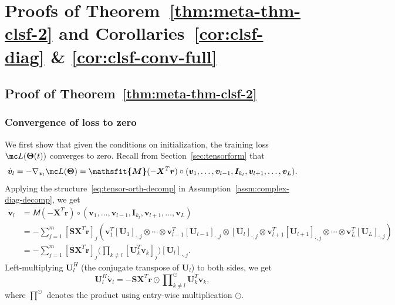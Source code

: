\documentclass{article} %
\def\vr{{\bm{r}}}
\def\vv{{\bm{v}}}
\def\mI{{\bm{I}}}
\def\mS{{\bm{S}}}
\def\mU{{\bm{U}}}
\def\mX{{\bm{X}}}
\newcommand{\tens}[1]{\bm{\mathsfit{#1}}}
\def\tM{{\tens{M}}}
\newcommand{\bTheta}{\bm{\Theta}}
\begin{document}
\section{Proofs of Theorem~\ref{thm:meta-thm-clsf-2} and Corollaries~\ref{cor:clsf-diag} \& \ref{cor:clsf-conv-full}}
\label{sec:proof-meta-thm-clsf-2}
\subsection{Proof of Theorem~\ref{thm:meta-thm-clsf-2}}
\subsubsection{Convergence of loss to zero}
\label{sec:proof-meta-thm-clsf-2-conv}
We first show that given the conditions on initialization, the training loss $\mc L(\bTheta(t))$ converges to zero.
Recall from Section~\ref{sec:tensorform} that
\begin{align*}
    \dot \vv_l 
    = -\nabla_{\vv_l} \mc L(\bTheta)
    = \tM(-\mX^T \vr) \circ (\vv_1, \dots, \vv_{l-1}, \mI_{k_l}, \vv_{l+1}, \dots, \vv_L).
\end{align*}
Applying the structure~\eqref{eq:tensor-orth-decomp} in Assumption~\ref{assm:complex-diag-decomp}, we get
\begin{align*}
    \dot \vv_l 
    &= \tM(-\mX^T \vr) \circ (\vv_1, \dots, \vv_{l-1}, \mI_{k_l}, \vv_{l+1}, \dots, \vv_L)\\
    &= -\!\sum_{j=1}^m [\mS\mX^T\vr]_j (\vv_1^T[\mU_1]_{\cdot,j} \!\otimes \cdots \otimes \vv_{l-1}^T[\mU_{l-1}]_{\cdot,j} \!\otimes [\mU_l]_{\cdot, j} \!\otimes \vv_{l+1}^T[\mU_{l+1}]_{\cdot, j} \!\otimes \cdots \otimes \vv_{L}^T[\mU_{L}]_{\cdot, j})\\
    &= -\sum_{j=1}^m [\mS\mX^T\vr]_j \bigg(\prod_{k\neq l} [\mU_k^T \vv_k]_{j} \bigg) [\mU_l]_{\cdot, j}.
\end{align*}
Left-multiplying $\mU_l^H$ (the conjugate transpose of $\mU_l$) to both sides, we get
\begin{equation}
\label{eq:proof-clsf-meta2-1}
    \mU_l^H \dot \vv_l = - \mS \mX^T \vr \odot \prod\nolimits_{k \neq l}^{\odot} \mU_k^T \vv_k,
\end{equation}
where $\prod^\odot$ denotes the product using entry-wise multiplication $\odot$.
\end{document}

